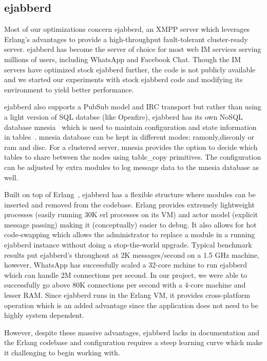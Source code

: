 \documentclass[a4paper, twocolumn]{article}
\begin{document}
\subsection{ejabberd}
Most of our optimizations concern ejabberd, an XMPP server which leverages Erlang's advantages to provide a high-throughput fault-tolerant cluster-ready server. ejabberd has become the server of choice for most web IM services serving millions of users, including WhatsApp and Facebook Chat. Though the IM servers have optimized stock ejabberd further, the code is not publicly available and we started our experiments with stock ejabberd code and modifying its environment to yield better performance.

ejabberd also supports a PubSub model and IRC transport but rather than using a light version of SQL databse (like Openfire), ejabberd has its own NoSQL database mnesia~\cite{mnesia} which is used to maintain configuration and state information in tables~\cite{ej1}. mnesia database can be kept in different modes: ramonly,disconly or ram and disc. For a clustered server, mnesia provides the option to decide which tables to share between the nodes using table\_copy primitives. The configuration can be adjusted by extra modules to log message data to the mnesia database as well. 

Built on top of Erlang~\cite{erlang}, ejabberd has a flexible structure where modules can be inserted and removed from the codebase. Erlang provides extremely lightweight processes (easily running 30K erl processes on its VM) and actor model (explicit message passing) making it (conceptually) easier to debug. It also allows for hot code-swapping which allows the administrator to replace a module in a running ejabberd instance without doing a stop-the-world upgrade. Typical benchmark results put ejabberd's throughout at 2K messages/second on a 1.5 GHz machine, however, WhatsApp has successfully scaled a 32-core mchine to run ejabberd which can handle 2M connections per second. In our project, we were able to successfully go above 80K connections per second with a 4-core machine and lesser RAM. Since ejabberd runs in the Erlang VM, it provides cross-platform operation which is an added advantage since the application does not need to be highly system dependent. 

However, despite these massive advantages, ejabberd lacks in documentation and the Erlang codebase and configuration requires a steep learning curve which make it challenging to begin working with. 
\end{document}
